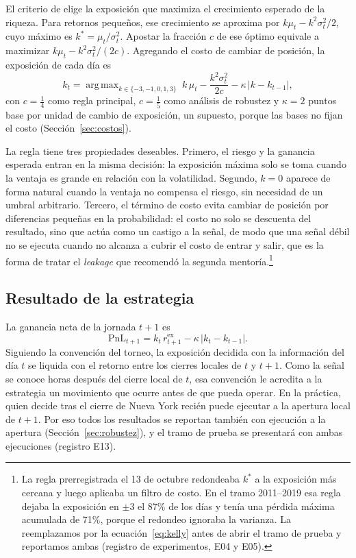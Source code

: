 \documentclass[11pt,a4paper]{article}
\newcommand{\rex}{r^{\text{ex}}}
\DeclareMathOperator*{\argmax}{arg\,max}
\begin{document}
El criterio de \citet{kelly1956} elige la exposición que maximiza el crecimiento esperado de la riqueza. Para retornos pequeños, ese crecimiento se aproxima por \(k\mu_t-k^2\sigma_t^2/2\), cuyo máximo es \(k^*=\mu_t/\sigma_t^2\). Apostar la fracción \(c\) de ese óptimo equivale a maximizar \(k\mu_t-k^2\sigma_t^2/(2c)\). Agregando el costo de cambiar de posición, la exposición de cada día es
\begin{equation}\label{eq:kelly}
k_t = \argmax_{k\in\{-3,-1,0,1,3\}} \; k\,\mu_t - \frac{k^2\sigma_t^2}{2c} - \kappa\,|k-k_{t-1}|,
\end{equation}
con \(c=\tfrac14\) como regla principal, \(c=\tfrac15\) como análisis de robustez y \(\kappa=2\) puntos base por unidad de cambio de exposición, un supuesto, porque las bases no fijan el costo (Sección~\ref{sec:costos}).

La regla tiene tres propiedades deseables. Primero, el riesgo y la ganancia esperada entran en la misma decisión: la exposición máxima solo se toma cuando la ventaja es grande en relación con la volatilidad. Segundo, \(k=0\) aparece de forma natural cuando la ventaja no compensa el riesgo, sin necesidad de un umbral arbitrario. Tercero, el término de costo evita cambiar de posición por diferencias pequeñas en la probabilidad: el costo no solo se descuenta del resultado, sino que actúa como un castigo a la señal, de modo que una señal débil no se ejecuta cuando no alcanza a cubrir el costo de entrar y salir, que es la forma de tratar el \emph{leakage} que recomendó la segunda mentoría.\footnote{La regla prerregistrada el 13 de octubre redondeaba \(k^*\) a la exposición más cercana y luego aplicaba un filtro de costo. En el tramo 2011--2019 esa regla dejaba la exposición en \(\pm3\) el 87\% de los días y tenía una pérdida máxima acumulada de 71\%, porque el redondeo ignoraba la varianza. La reemplazamos por la ecuación~\eqref{eq:kelly} antes de abrir el tramo de prueba y reportamos ambas (registro de experimentos, E04 y E05).}

\subsection{Resultado de la estrategia}
La ganancia neta de la jornada \(t+1\) es
\begin{equation}\label{eq:pnl}
\text{PnL}_{t+1} = k_t\,\rex_{t+1} - \kappa\,|k_t-k_{t-1}|.
\end{equation}
Siguiendo la convención del torneo, la exposición decidida con la información del día \(t\) se liquida con el retorno entre los cierres locales de \(t\) y \(t+1\). Como la señal se conoce horas después del cierre local de \(t\), esa convención le acredita a la estrategia un movimiento que ocurre antes de que pueda operar. En la práctica, quien decide tras el cierre de Nueva York recién puede ejecutar a la apertura local de \(t+1\). Por eso todos los resultados se reportan también con ejecución a la apertura (Sección~\ref{sec:robustez}), y el tramo de prueba se presentará con ambas ejecuciones (registro E13).
\end{document}
